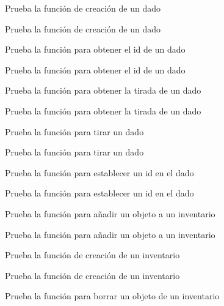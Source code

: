 
\begin{DoxyRefList}
\item[\label{test__test000158}%
\Hypertarget{test__test000158}%
Member \hyperlink{die__test_8h_ac0b610468bd3d3b358051c966b771431}{test1\+\_\+die\+\_\+create} ()]Prueba la función de creación de un dado 

Prueba la función de creación de un dado  
\item[\label{test__test000161}%
\Hypertarget{test__test000161}%
Member \hyperlink{die__test_8h_ad27d80a80c4b4fa108337135d5633c90}{test1\+\_\+die\+\_\+get\+\_\+id} ()]Prueba la función para obtener el id de un dado 

Prueba la función para obtener el id de un dado  
\item[\label{test__test000165}%
\Hypertarget{test__test000165}%
Member \hyperlink{die__test_8h_a99e873ecce6a19186919e991876dadbe}{test1\+\_\+die\+\_\+get\+\_\+last\+\_\+roll} ()]Prueba la función para obtener la tirada de un dado 

Prueba la función para obtener la tirada de un dado  
\item[\label{test__test000163}%
\Hypertarget{test__test000163}%
Member \hyperlink{die__test_8h_ac005cb42fa33b38a79896934a5a50001}{test1\+\_\+die\+\_\+roll} ()]Prueba la función para tirar un dado 

Prueba la función para tirar un dado  
\item[\label{test__test000159}%
\Hypertarget{test__test000159}%
Member \hyperlink{die__test_8h_a35fcde570292ad4ff9a876b5e2a2d3f3}{test1\+\_\+die\+\_\+set\+\_\+id} ()]Prueba la función para establecer un id en el dado 

Prueba la función para establecer un id en el dado  
\item[\label{test__test000172}%
\Hypertarget{test__test000172}%
Member \hyperlink{inventory__test_8h_abddf20d7b11937754a88fb57c9d74292}{test1\+\_\+inventory\+\_\+add\+\_\+object} ()]Prueba la función para añadir un objeto a un inventario 

Prueba la función para añadir un objeto a un inventario  
\item[\label{test__test000167}%
\Hypertarget{test__test000167}%
Member \hyperlink{inventory__test_8h_a33638f1a88ae16ab8d6bee00145b82b8}{test1\+\_\+inventory\+\_\+create} ()]Prueba la función de creación de un inventario 

Prueba la función de creación de un inventario  
\item[\label{test__test000169}%
\Hypertarget{test__test000169}%
Member \hyperlink{inventory__test_8h_af6ad6f6d577b5f123f36351139c6d918}{test1\+\_\+inventory\+\_\+delete\+\_\+object} ()]Prueba la función para borrar un objeto de un inventario 


\end{DoxyRefList}
